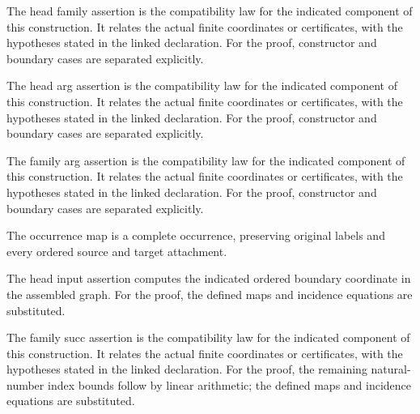 The head family assertion is the compatibility law for the indicated component of this construction. It relates the actual finite coordinates or certificates, with the hypotheses stated in the linked declaration.
For the proof, constructor and boundary cases are separated explicitly.
\par{}

The head arg assertion is the compatibility law for the indicated component of this construction. It relates the actual finite coordinates or certificates, with the hypotheses stated in the linked declaration.
For the proof, constructor and boundary cases are separated explicitly.
\par{}

The family arg assertion is the compatibility law for the indicated component of this construction. It relates the actual finite coordinates or certificates, with the hypotheses stated in the linked declaration.
For the proof, constructor and boundary cases are separated explicitly.
\par{}

The occurrence map is a complete occurrence, preserving original labels and every ordered source and target attachment.
\par{}

The head input assertion computes the indicated ordered boundary coordinate in the assembled graph.
For the proof, the defined maps and incidence equations are substituted.
\par{}

The family succ assertion is the compatibility law for the indicated component of this construction. It relates the actual finite coordinates or certificates, with the hypotheses stated in the linked declaration.
For the proof, the remaining natural-number index bounds follow by linear arithmetic; the defined maps and incidence equations are substituted.
\par{}

